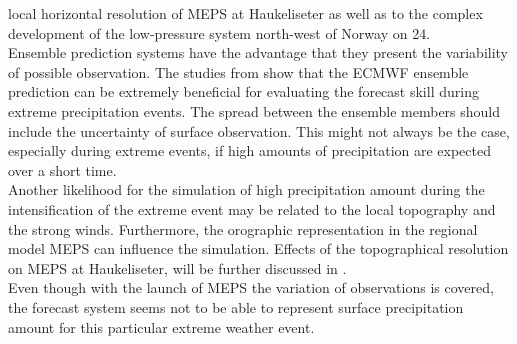 local horizontal resolution of MEPS at Haukeliseter as well as to the complex development of the low-pressure system north-west of Norway on \SI{24}{\dec}. 
\\
Ensemble prediction systems have the advantage that they present the variability of possible observation. %
The studies from \citet{petroliagis_potential_1997,buizza_probabilistic_1999} show that the ECMWF ensemble prediction can be extremely beneficial for evaluating the forecast skill during extreme precipitation events. The spread between the ensemble members should include the uncertainty of surface observation. This might not always be the case, especially during extreme events, if high amounts of precipitation are expected over a short time. 
\\
Another likelihood for the simulation of high precipitation amount during the intensification of the extreme event may be related to the local topography and the strong winds. Furthermore, the orographic representation in the regional model MEPS can influence the simulation. Effects of the topographical resolution on MEPS at Haukeliseter, will be further discussed in . 
\\
Even though with the launch of MEPS the variation of observations is covered, the forecast system seems not to be able to represent surface precipitation amount for this particular extreme weather event. 
